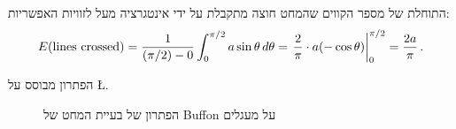 התוחלת של מספר הקווים שהמחט חוצה מתקבלת על ידי אינטגרציה מעל לזוויות האפשריות:
\begin{equation}\label{eq.buffon-integral}
E(\textrm{lines crossed}) =
  \displaystyle\frac{1}{(\pi/2)-0} \int_0^{\pi/2} a\sin \theta\,
  d\theta=\left.\displaystyle\frac{2}{\pi}\cdot a (-\cos \theta)
  \right|_0^{\pi/2}=\displaystyle\frac{2a}{\pi}\,.
\end{equation}

הפתרון מבוסס על
\L{\cite[Chapter~26]{proofs}}.

\begin{figure}[tb]
\begin{center}
\end{center}
\caption{%
הפתרון של בעיית המחט של Buffon על מעגלים}
\label{f.buffon3}
\end{figure}

